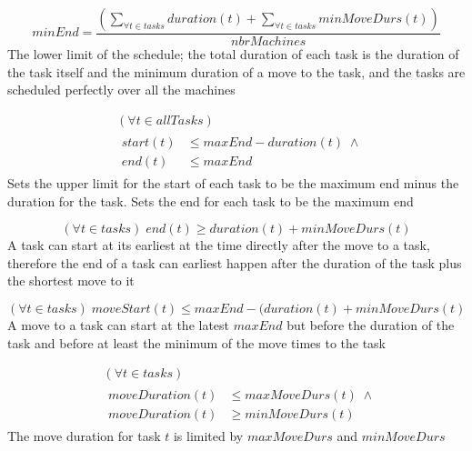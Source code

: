 \documentclass[10pt,a4paper]{report}
\begin{document}
\begin{equation}\label{eq:60}
minEnd = \frac{\left(\sum_{\forall t \in tasks} duration(t) + \sum_{\forall t \in tasks} minMoveDurs(t)\right)}{nbrMachines}
\end{equation}
The lower limit of the schedule; the total duration of each task is the duration of the task itself and the minimum duration of a move to the task, and the tasks are scheduled perfectly over all the machines

\begin{equation}\label{eq:61}
\begin{aligned}
&(\forall t \in allTasks)\\
&\begin{aligned}
start(t) &\le maxEnd-duration(t) \; \land\\
end(t) &\le maxEnd
\end{aligned}
\end{aligned}
\end{equation}
Sets the upper limit for the start of each task to be the maximum end minus the duration for the task. Sets the end for each task to be the maximum end

\begin{equation}\label{eq:62}
(\forall t \in tasks) \; end(t) \ge duration(t) + minMoveDurs(t)\end{equation}
A task can start at its earliest at the time directly after the move to a task, therefore the end of a task can earliest happen after the duration of the task plus the shortest move to it

\begin{equation}\label{eq:63}
(\forall t \in tasks) \; moveStart(t) \le maxEnd-(duration(t)+minMoveDurs(t)\end{equation}
A move to a task can start at the latest $maxEnd$ but before the duration of the task and before at least the minimum of the move times to the task

\begin{equation}
\begin{aligned}\label{eq:64}
&(\forall t \in tasks)\\
&\begin{aligned}
moveDuration(t) &\le maxMoveDurs(t) \; \land\\
moveDuration(t) &\ge minMoveDurs(t)
\end{aligned}
\end{aligned}
\end{equation}
The move duration for task $t$ is limited by $maxMoveDurs$ and $minMoveDurs$
\end{document}
